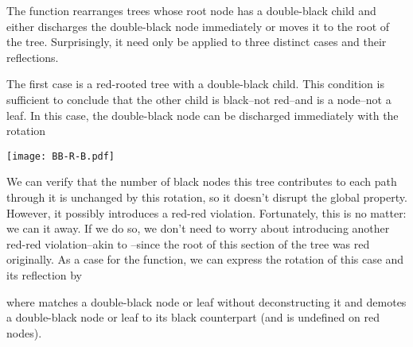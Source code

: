 \documentclass[preprint]{sigplanconf}
\begin{document}
The  function rearranges trees whose root node has a double-black
child and either discharges the double-black node immediately or moves it to the
root of the tree. Surprisingly, it need only be applied to three distinct cases
and their reflections.

The first case is a red-rooted tree with a double-black child. This condition is
sufficient to conclude that the other child is black--not red--and is a
node--not a leaf. In this case, the double-black node can be discharged
immediately with the rotation
\begin{center}
\texttt{[image: BB-R-B.pdf]}
\end{center}
We can verify that the number of black nodes this tree contributes to each path
through it is unchanged by this rotation, so it doesn't disrupt the global
property. However, it possibly introduces a red-red violation. Fortunately, this
is no matter: we can  it away. If we do so, we don't need to
worry about introducing another red-red violation--akin to
--since the root of this section of the tree was red originally.
As a case for the  function, we can express the rotation of this
case and its reflection by
\begin{schemedisplay}
[(R (BB? a-x-b) y (B c z d))
 (balance (B (R (-B a-x-b) y c) z d))]
[(R (B a x b) y (BB? c-z-d))
 (balance (B a x (R b y (-B c-z-d))))]
\end{schemedisplay}
where  matches a double-black node or leaf without deconstructing it
and  demotes a double-black node or leaf to its black counterpart
(and is undefined on red nodes).
\end{document}
